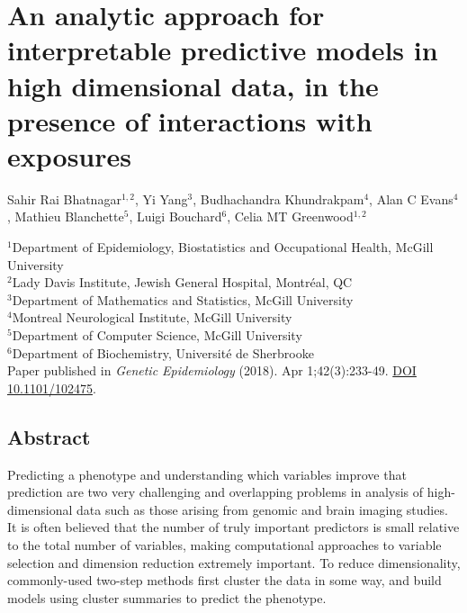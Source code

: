 \chapter{An analytic approach for interpretable predictive models in high dimensional data, in the presence of interactions with exposures\label{ch:eclust}}

Sahir Rai Bhatnagar$^{1,2}$, Yi Yang$^{3}$, Budhachandra Khundrakpam$^{4}$, Alan C Evans$^{4}$, Mathieu Blanchette$^{5}$, Luigi Bouchard$^{6}$, Celia MT Greenwood$^{1,2}$

$^{1}$Department of Epidemiology, Biostatistics and Occupational Health, McGill University\\
$^{2}$Lady Davis Institute, Jewish General Hospital, Montr\'{e}al, QC \\
$^{3}$Department of Mathematics and Statistics, McGill University\\
$^{4}$Montreal Neurological Institute, McGill University\\
$^{5}$Department of Computer Science, McGill University\\
$^{6}$Department of Biochemistry, Universit\'{e} de Sherbrooke\\

Paper published in \textit{Genetic Epidemiology} (2018). Apr 1;42(3):233-49.  \href{https://doi.org/10.1101/102475}{DOI 10.1101/102475}.

\newpage

\section*{Abstract}

Predicting a phenotype and understanding which variables improve that prediction are two very challenging	and overlapping problems in analysis of high-dimensional data such as those arising from genomic and brain imaging studies. It is often believed that the number of truly important predictors is small relative to the total number of variables, making computational approaches to variable selection and dimension reduction extremely important. To reduce dimensionality, commonly-used two-step methods first cluster the data in some way, and build models using cluster summaries to predict the phenotype.\\


